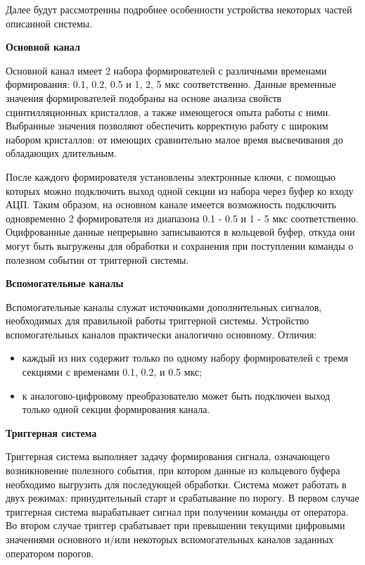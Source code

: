 Далее будут рассмотренны подробнее особенности устройства некоторых частей описанной системы.\par
\textbf{Основной канал}\par
Основной канал имеет 2 набора формирователей с различными временами формирования: 0.1, 0.2, 0.5 и 1, 2, 5 мкс соответственно. Данные временные значения формирователей подобраны на основе анализа свойств сцинтилляционных кристаллов, а также имеющегося опыта работы с ними. Выбранные значения позволяют обеспечить корректную работу с широким набором кристаллов: от имеющих сравнительно малое время высвечивания до обладающих длительным.\par
После каждого формирователя установлены электронные ключи, с помощью которых можно подключить выход одной секции из набора через буфер ко входу АЦП. Таким образом, на основном канале имеется возможность подключить одновременно 2 формирователя из диапазона 0.1 - 0.5 и 1 - 5 мкс соответственно. Оцифрованные данные непрерывно записываются в кольцевой буфер, откуда они могут быть выгружены для обработки и сохранения при поступлении команды о полезном событии от триггерной системы.\par
\textbf{Вспомогательные каналы}\par
Вспомогательные каналы служат источниками дополнительных сигналов, необходимых для правильной работы триггерной системы. Устройство вспомогательных каналов практически аналогично основному. Отличия:\par
\begin{itemize}
    \item каждый из них содержит только по одному набору формирователей с тремя секциями с временами 0.1, 0.2, и 0.5 мкс;
    \item к аналогово-цифровому преобразователю может быть подключен выход только одной секции формирования канала.
\end{itemize}\par
\textbf{Триггерная система}\par
Триггерная система выполняет задачу формирования сигнала, означающего возникновение полезного события, при котором данные из кольцевого буфера необходимо выгрузить для последующей обработки. Система может работать в двух режимах: принудительный старт и срабатывание по порогу. В первом случае триггерная система вырабатывает сигнал при получении команды от оператора. Во втором случае триггер срабатывает при превышении текущими цифровыми значениями основного и/или некоторых вспомогательных каналов заданных оператором порогов.
